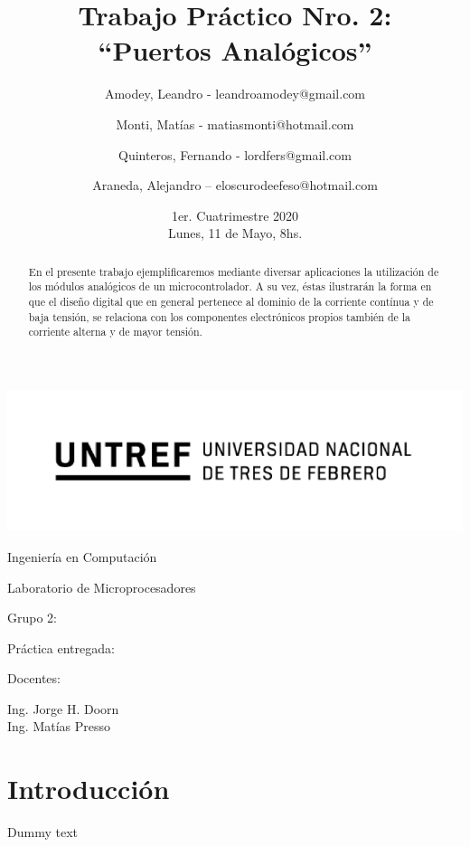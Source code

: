 \documentclass{article}
\title{Trabajo Práctico Nro. 2:\\“Puertos Analógicos”}
\author{Amodey, Leandro - leandroamodey@gmail.com
\and Monti, Matías - matiasmonti@hotmail.com
\and Quinteros, Fernando - lordfers@gmail.com
\and Araneda, Alejandro – eloscurodeefeso@hotmail.com}
\date{1er. Cuatrimestre 2020\\Lunes, 11 de Mayo, 8hs.}
\def\teacher{Ing. Jorge H. Doorn\\Ing. Matías Presso}
\begin{document}
\begin{titlepage}
\makeatletter 
\centering
\includegraphics{logo.png}\par
{\Large Ingeniería en Computación \par}
\vspace{0.5cm}
{\LARGE Laboratorio de Microprocesadores \par}
\vfill
{\huge \@title \par}
\vfill
Grupo 2:\par
{\renewcommand{\and}{\par}\@author}
\vfill
Práctica entregada:\par
\@date
\vfill
Docentes:\par
\teacher
\vspace{1cm}
\makeatother
\end{titlepage}

\begin{abstract}
En el presente trabajo ejemplificaremos mediante diversar aplicaciones 
la utilización de los módulos analógicos de un microcontrolador. A su 
vez, éstas ilustrarán la forma en que el diseño digital que en general 
pertenece al dominio de la corriente contínua y de baja tensión, se 
relaciona con los componentes electrónicos propios también de la 
corriente alterna y de mayor tensión.
\end{abstract}

\section*{Introducción}
Dummy text
\end{document}
